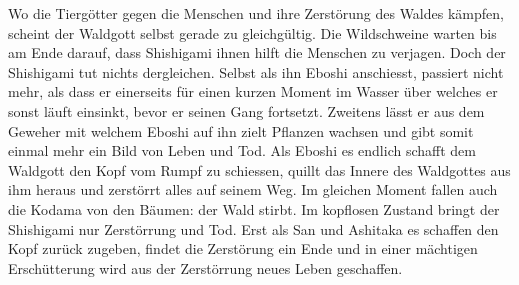 Wo die Tiergötter gegen die Menschen und ihre Zerstörung des Waldes kämpfen, scheint der Waldgott selbst gerade zu gleichgültig. Die Wildschweine warten bis am Ende darauf, dass Shishigami ihnen hilft die Menschen zu verjagen. Doch der Shishigami tut nichts dergleichen. Selbst als ihn Eboshi anschiesst, passiert nicht mehr, als dass er einerseits für einen kurzen Moment im Wasser über welches er sonst läuft einsinkt, bevor er seinen Gang fortsetzt. Zweitens lässt er aus dem Geweher mit welchem Eboshi auf ihn zielt Pflanzen wachsen und gibt somit einmal mehr ein Bild von Leben und Tod. Als Eboshi es endlich schafft dem Waldgott den Kopf vom Rumpf zu schiessen, quillt das Innere des Waldgottes aus ihm heraus und zerstörrt alles auf seinem Weg. Im gleichen Moment fallen auch die Kodama von den Bäumen: der Wald stirbt. Im kopflosen Zustand bringt der Shishigami nur Zerstörrung und Tod. Erst als San und Ashitaka es schaffen den Kopf zurück zugeben, findet die Zerstörung ein Ende und in einer mächtigen Erschütterung wird aus der Zerstörrung neues Leben geschaffen. 